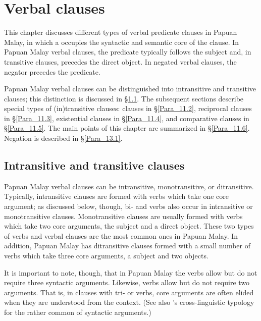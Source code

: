 \chapter[Verbal clauses]{Verbal clauses}
\label{Para_11}
This chapter discusses different types of verbal predicate clauses in Papuan Malay, in which a  occupies the syntactic and semantic core of the clause. In Papuan Malay verbal clauses, the predicate typically follows the subject and, in transitive clauses, precedes the direct object. In negated verbal clauses, the negator precedes the predicate.



Papuan Malay verbal clauses can be distinguished into intransitive and transitive clauses; this distinction is discussed in §\ref{Para_11.1}. The subsequent sections describe special types of (in)transitive clauses:  clauses in §\ref{Para_11.2}, reciprocal clauses in §\ref{Para_11.3}, existential clauses in §\ref{Para_11.4}, and comparative clauses in §\ref{Para_11.5}. The main points of this chapter are summarized in §\ref{Para_11.6}. Negation is described in §\ref{Para_13.1}.


\section{Intransitive and transitive clauses}
\label{Para_11.1}
Papuan Malay verbal clauses can be intransitive, monotransitive, or ditransitive. Typically, intransitive clauses are formed with  verbs which take one core argument; as discussed below, though, bi- and  verbs also occur in intransitive or monotransitive clauses. Monotransitive clauses are usually formed with  verbs which take two core arguments, the subject and a direct object. These two types of verbs and verbal clauses are the most common ones in Papuan Malay. In addition, Papuan Malay has ditransitive clauses formed with a small number of  verbs which take three core arguments, a subject and two objects.



It is important to note, though, that in Papuan Malay the  verbs allow but do not require three syntactic arguments. Likewise,  verbs allow but do not require two arguments. That is, in clauses with tri- or  verbs, core arguments are often elided when they are understood from the context. (See also \citeauthor{Margetts.2007}'s \citeyear*{Margetts.2007} cross-linguistic typology for the rather common  of syntactic arguments.)




